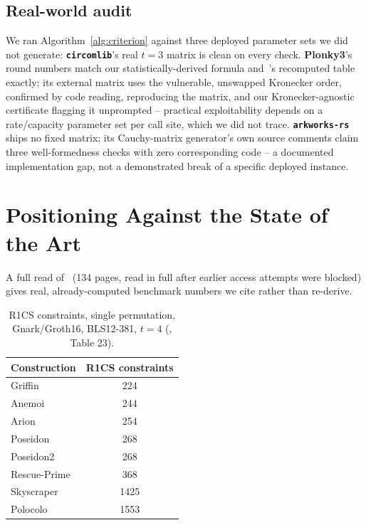 \documentclass[conference]{IEEEtran}
\theoremstyle{definition}
\theoremstyle{plain}
\begin{document}
\subsection{Real-world audit}
\label{sec:audit}
We ran Algorithm~\ref{alg:criterion} against three deployed parameter
sets we did not generate: \textbf{\texttt{circomlib}}'s real $t=3$
matrix is clean on every check. \textbf{Plonky3}'s round numbers match
our statistically-derived formula and~\cite{sok2026}'s recomputed table
exactly; its external matrix uses the vulnerable, unswapped Kronecker
order, confirmed by code reading, reproducing the matrix, and our
Kronecker-agnostic certificate flagging it unprompted -- practical
exploitability depends on a rate/capacity parameter set per call site,
which we did not trace. \textbf{\texttt{arkworks-rs}} ships no fixed
matrix; its Cauchy-matrix generator's own source comments claim three
well-formedness checks with zero corresponding code -- a documented
implementation gap, not a demonstrated break of a specific deployed
instance.

\section{Positioning Against the State of the Art}
\label{sec:sok}

A full read of~\cite{sok2026} (134 pages, read in full after earlier
access attempts were blocked) gives real, already-computed benchmark
numbers we cite rather than re-derive.

\begin{table}[t]
\centering
\caption{R1CS constraints, single permutation, Gnark/Groth16, BLS12-381,
$t=4$ (\cite{sok2026}, Table 23).}
\label{tab:sok}
\small
\begin{tabular}{@{}lc@{}}
\toprule
Construction & R1CS constraints \\
\midrule
Griffin & 224 \\
Anemoi~\cite{anemoi2022} & 244 \\
Arion & 254 \\
Poseidon~\cite{poseidon2021} & 268 \\
Poseidon2~\cite{poseidon22023} & 268 \\
Rescue-Prime & 368 \\
Skyscraper & 1425 \\
Polocolo~\cite{polocolo2025} & 1553 \\
\bottomrule
\end{tabular}
\end{table}
\end{document}
